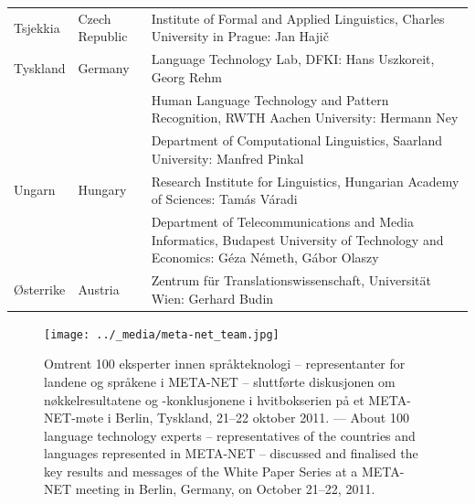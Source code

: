 \begin{longtable}{llp{114mm}}
  Tsjekkia & \textcolor{grey1}{Czech Republic} & Institute of Formal and Applied Linguistics, Charles University in Prague: Jan Hajič \\ \addlinespace
  Tyskland & \textcolor{grey1}{Germany} & Language Technology Lab, DFKI: Hans Uszkoreit, Georg Rehm\\ \addlinespace
  & & Human Language Technology and Pattern Recognition, RWTH Aachen University: Hermann Ney \\ \addlinespace
  & & Department of Computational Linguistics, Saarland University:
  Manfred Pinkal\\ \addlinespace 
   Ungarn & \textcolor{grey1}{Hungary} & Research Institute for Linguistics, Hungarian Academy of Sciences: Tamás Váradi\\  \addlinespace
  & & Department of Telecommunications and Media Informatics, Budapest University of Technology and Economics: Géza Németh, Gábor Olaszy \\ \addlinespace
  Østerrike & \textcolor{grey1}{Austria} & Zentrum für Translationswissenschaft, Universität Wien: Gerhard Budin
\end{longtable}
\normalsize

\renewcommand*{\figureformat}{}
\renewcommand*{\captionformat}{}

\begin{figure}[htbp]
  \center
  \texttt{[image: ../\_media/meta-net\_team.jpg]}
  \caption{Omtrent 100 eksperter innen språkteknologi -- representanter for landene og språkene i META-NET -- sluttførte diskusjonen om nøkkelresultatene og -konklusjonene i hvitbokserien på et META-NET-møte i Berlin, Tyskland, 21--22 oktober 2011. --- \textcolor{grey1}{About 100 language technology experts -- representatives of the countries and languages represented in META-NET -- discussed and finalised the key results and messages of the White Paper Series at a META-NET meeting in Berlin, Germany, on October 21--22, 2011.}}
  \medskip
\end{figure}

\cleardoublepage

\label{whitepaperseries}

